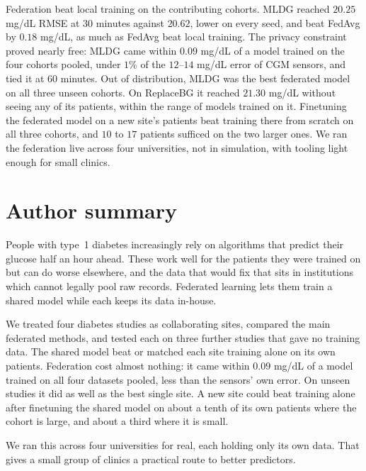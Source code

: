 \documentclass[10pt,letterpaper]{article}
\begin{document}
Federation beat local training on the contributing cohorts. MLDG
reached $20.25$ mg/dL RMSE at 30 minutes against $20.62$, lower on every
seed, and beat FedAvg by $0.18$ mg/dL, as much as FedAvg beat local
training. The privacy constraint proved nearly free: MLDG came within $0.09$ mg/dL of a
model trained on the four cohorts pooled, under $1\%$ of the $12$--$14$
mg/dL error of CGM sensors, and tied it at 60 minutes.
Out of distribution, MLDG was the best federated model on all three unseen
cohorts. On ReplaceBG it reached
$21.30$ mg/dL without seeing any of its patients, within the range of models
trained on it. Finetuning the federated model on a new site's
patients beat training there from scratch on all three cohorts, and $10$ to
$17$ patients sufficed on the two larger ones. We ran the federation live
across four universities, not in simulation, with tooling light enough for
small clinics.

\section*{Author summary}
People with type~1 diabetes increasingly rely on algorithms that predict their
glucose half an hour ahead. These work well for the patients they were trained
on but can do worse elsewhere, and the data that would fix that sits in
institutions which cannot legally pool raw records. Federated learning lets
them train a shared model while each keeps its data in-house.

We treated four diabetes studies as collaborating sites, compared the main
federated methods, and tested each on three further studies that gave no
training data. The shared model beat or matched each site training alone on
its own patients. Federation cost almost nothing: it came within $0.09$ mg/dL
of a model trained on all four datasets pooled, less than the sensors' own
error. On unseen studies it did as well as the best single site. A new site
could beat training alone after finetuning the shared model on about a tenth
of its own patients where the cohort is large, and about a third where it is
small.

We ran this across four universities for real, each holding only its own data.
That gives a small group of clinics a practical route to better predictors.

\clearpage
{}
\linenumbers

\end{document}
